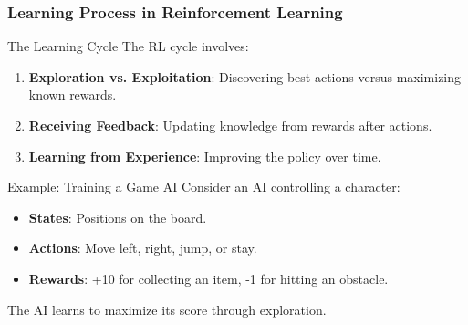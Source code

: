\documentclass[aspectratio=169]{beamer}
\begin{document}
\begin{frame}[fragile]
    \frametitle{Learning Process in Reinforcement Learning}
    \begin{block}{The Learning Cycle}
        The RL cycle involves:
        \begin{enumerate}
            \item \textbf{Exploration vs. Exploitation}: Discovering best actions versus maximizing known rewards.
            \item \textbf{Receiving Feedback}: Updating knowledge from rewards after actions.
            \item \textbf{Learning from Experience}: Improving the policy over time.
        \end{enumerate}
    \end{block}
    
    \begin{block}{Example: Training a Game AI}
        Consider an AI controlling a character:
        \begin{itemize}
            \item \textbf{States}: Positions on the board.
            \item \textbf{Actions}: Move left, right, jump, or stay.
            \item \textbf{Rewards}: +10 for collecting an item, -1 for hitting an obstacle.
        \end{itemize}
        The AI learns to maximize its score through exploration.
    \end{block}
\end{frame}
\end{document}
